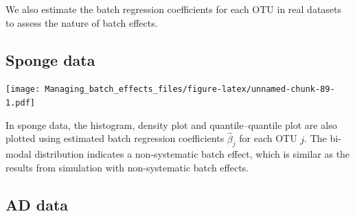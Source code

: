 \documentclass[]{book}
\newenvironment{Shaded}{\begin{snugshade}}{\end{snugshade}}
\newcommand{\KeywordTok}[1]{\textcolor[rgb]{0.13,0.29,0.53}{\textbf{#1}}}
\newcommand{\DataTypeTok}[1]{\textcolor[rgb]{0.13,0.29,0.53}{#1}}
\newcommand{\DecValTok}[1]{\textcolor[rgb]{0.00,0.00,0.81}{#1}}
\newcommand{\StringTok}[1]{\textcolor[rgb]{0.31,0.60,0.02}{#1}}
\newcommand{\ControlFlowTok}[1]{\textcolor[rgb]{0.13,0.29,0.53}{\textbf{#1}}}
\newcommand{\OperatorTok}[1]{\textcolor[rgb]{0.81,0.36,0.00}{\textbf{#1}}}
\newcommand{\NormalTok}[1]{#1}
\begin{document}
We also estimate the batch regression coefficients for each OTU in real
datasets to assess the nature of batch effects.

\subsection{Sponge data}\label{sponge-data}

\begin{Shaded}
\end{Shaded}

\texttt{[image: Managing\_batch\_effects\_files/figure-latex/unnamed-chunk-89-1.pdf]}

In sponge data, the histogram, density plot and quantile--quantile plot
are also plotted using estimated batch regression coefficients
\(\hat{\beta}_{j}\) for each OTU \(j\). The bi-modal distribution
indicates a non-systematic batch effect, which is similar as the results
from simulation with non-systematic batch effects.

\subsection{AD data}\label{ad-data}
\end{document}
